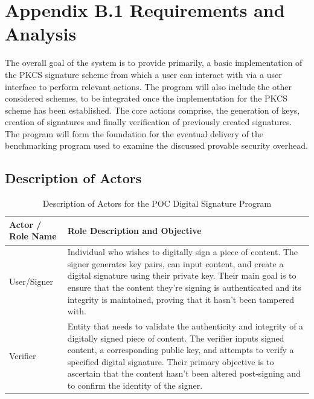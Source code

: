 \documentclass[]{final_report}
\theoremstyle{definition}
\begin{document}
\section{Appendix B.1 Requirements and Analysis}
The overall goal of the system is to provide primarily, a basic implementation of the PKCS signature scheme from which a user can interact with via a user interface to perform relevant actions. The program will also include the other considered schemes, to be integrated once the implementation for the PKCS scheme has been established.
The core actions comprise, the generation of keys, creation of signatures and finally verification of previously created signatures. 
The program will form the foundation for the eventual delivery of the benchmarking program used to examine the discussed provable security overhead.

\subsection{Description of Actors}
\begin{table}[H]
    \centering
    \caption{Description of Actors for the POC Digital Signature Program}
    \label{tab:actors_description}
    \begin{tabular}{|l|p{10cm}|}
    \hline
    \textbf{Actor / Role Name} & \textbf{Role Description and Objective} \\
    \hline
    User/Signer & Individual who wishes to digitally sign a piece of content. The signer generates key pairs, can input content, and create a digital signature using their private key. Their main goal is to ensure that the content they're signing is authenticated and its integrity is maintained, proving that it hasn't been tampered with. \\
    \hline
    Verifier & Entity that needs to validate the authenticity and integrity of a digitally signed piece of content. The verifier inputs signed content, a corresponding public key, and attempts to verify a specified digital signature. Their primary objective is to ascertain that the content hasn't been altered post-signing and to confirm the identity of the signer. \\
    \hline
    \end{tabular}
\end{table}
\end{document}
